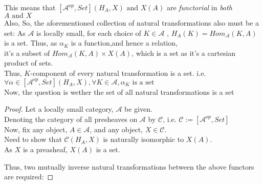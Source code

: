 \documentclass[18pt,a4paper]{extarticle}
\theoremstyle{definition}
\theoremstyle{definition}
\begin{document}
This means that $[ \mathcal{A}^{op},Set](H_A,X) \text{ and } X(A)$ are
\textit{functorial} in \textit{both} $A \text{ and } X$\\

Also,
So, the aforementioned collection of natural transformations also must be a set:
As $\mathcal{A} $ is locally small, for each choice of $K \in \mathcal{A} $ , $H_A(K)=Hom_{\mathcal{A}}(K,A)$ is a set.
Thus, as $\alpha_K $ is a function,and hence a relation,\\ it's a subset of $Hom_{\mathcal{A} }(K,A)\times X(A)$, which is a set as it's a cartesian product of sets.\\
Thus, $K$-component of every natural transformation is a set. i.e. $\forall \alpha \in [ \mathcal{A}^{op},Set](H_A,X), \forall K \in \mathcal{A}, \alpha_K \text{ is a set}$ \\

Now, the question is wether the set of all natural transformations is a set

\begin{proof}Let a locally small category,  $\mathcal{A} $ be given. \\

	Denoting the category of all presheaves on $\mathcal{A} $ by $\mathcal{C}$,
	i.e. $\mathcal{C}:= [ \mathcal{A} ^{op}, Set] $  \\

	Now, fix any object, $A \in \mathcal{A} $, and any object, $X \in \mathcal{C}$.   \\

	Need to show that $\mathcal{C}(H_A,X) $ is naturally isomorphic to $X(A)$.\\
	As $X$ is a preasheaf, $X(A)$ is a set.

	Thus, two mutually inverse natural transformations between the above functors are required:

\end{proof}
\end{document}
